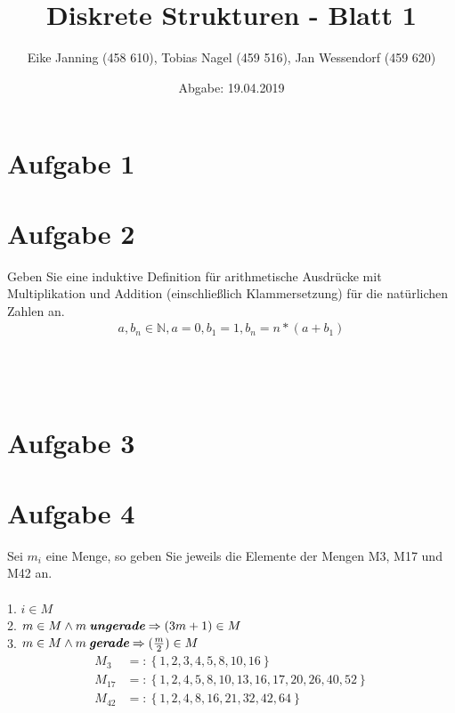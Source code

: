\documentclass[11pt]{article}
\title{Diskrete Strukturen - Blatt 1}
\author{Eike Janning (458 610), Tobias Nagel (459 516), Jan Wessendorf (459 620)}
\date{Abgabe: 19.04.2019}
\begin{document}
\maketitle

\section*{Aufgabe 1}

\pagebreak

\section*{Aufgabe 2}
	 Geben Sie eine induktive Definition für arithmetische Ausdrücke mit Multiplikation und Addition (einschließlich Klammersetzung) für die natürlichen Zahlen an.\\
	 	\begin{align*}
		 	a, b_n \in \mathbb{N}, a = 0, b_1 = 1, b_n = n*(a+b_1)
	 	\end{align*}\\\\\\

\section*{Aufgabe 3}
	
\pagebreak

\section*{Aufgabe 4}
Sei $m_i$ eine Menge, so geben Sie jeweils die Elemente der Mengen M3, M17 und M42 an.\\\\
	1. $ i \in M$\\
	2. $m \in M \land m\: \textit{\textbf{ungerade}} \Rightarrow (3m+1) \in M$\\
	3. $m \in M \land m\: \textit{\textbf{gerade}} \Rightarrow (\frac{m}{2}) \in M$
		\begin{align*}
			M_3 &=: \left\{1,2,3,4,5,8,10,16\right\}\\
			M_{17} &=: \left\{1,2,4,5,8,10,13,16,17,20,26,40,52\right\}\\
			M_{42} &=: \left\{1,2,4,8,16,21,32,42,64\right\}
		\end{align*}\\\\\\
		
\end{document}
